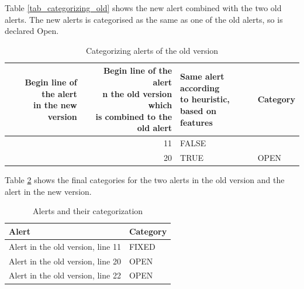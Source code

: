 \documentclass[
]{article}
\begin{document}
\normalsize

Table \ref{tab_categorizing_old} shows the new alert combined with the
two old alerts. The new alerts is categorised as the same as one of the
old alerts, so is declared Open.

\small

\begin{table}[H]

\caption{\label{tab:unnamed-chunk-16}Categorizing alerts of the old version \label{tab_categorizing_new} }
\centering
\begin{tabular}[t]{r|r|l|l}
\hline
\makecell[l]{Begin line of the alert\\in the new version} & \makecell[l]{Begin line of the alert\\n the old version which\\is combined to the old alert} & \makecell[l]{Same alert according\\to heuristic,\\ based on features} & Category\\
\hline
\rowcolor{gray!6}   & 11 & FALSE & \\

\multirow[t]{-2}{*}{\raggedleft\arraybackslash 22} & 20 & TRUE & \multirow[t]{-2}{*}{\raggedright\arraybackslash OPEN}\\
\hline
\end{tabular}
\end{table}

\normalsize

Table \ref{tab_summary_categories} shows the final categories for the
two alerts in the old version and the alert in the new version.

\small

\begin{table}[H]

\caption{\label{tab:unnamed-chunk-17}Alerts and their categorization\label{tab_summary_categories} }
\centering
\begin{tabular}[t]{l|l}
\hline
Alert & Category\\
\hline
\rowcolor{gray!6}  Alert in the old version, line 11 & FIXED\\
\hline
Alert in the old version, line 20 & OPEN\\
\hline
\rowcolor{gray!6}  Alert in the old version, line 22 & OPEN\\
\hline
\end{tabular}
\end{table}
\end{document}
